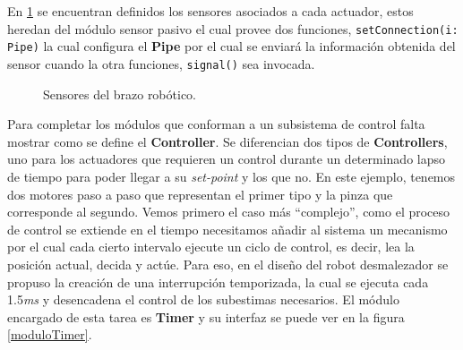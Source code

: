 En \ref{sensores} se encuentran definidos los sensores asociados a cada actuador, estos heredan del módulo sensor pasivo el cual provee dos funciones, \verb|setConnection(i: Pipe)| la cual configura el \textbf{Pipe} por el cual se enviará la información obtenida del sensor cuando la otra funciones, \verb|signal()| sea invocada.

\begin{figure}[h]
\caption{Sensores del brazo robótico.}
\label{sensores}
\begin{center}
\end{center}
\end{figure}

Para completar los módulos que conforman a un subsistema de control falta mostrar como se define el \textbf{Controller}. Se diferencian dos tipos de \textbf{Controllers}, uno para los actuadores que requieren un control durante un determinado lapso de tiempo para poder llegar a su \textit{set-point} y los que no. En este ejemplo, tenemos dos motores paso a paso que representan el primer tipo y la pinza que corresponde al segundo. Vemos primero el caso más ``complejo'', como el proceso de control se extiende en el tiempo necesitamos añadir al sistema un mecanismo por el cual cada cierto intervalo ejecute un ciclo de control, es decir, lea la posición actual, decida y actúe. Para eso, en el diseño del robot desmalezador \cite{paperPomponio} se propuso la creación de una interrupción temporizada, la cual se ejecuta cada 1.5\textit{ms} y desencadena el control de los subestimas necesarios. El módulo encargado de esta tarea es \textbf{Timer} y su interfaz se puede ver en la figura \ref{moduloTimer}.


